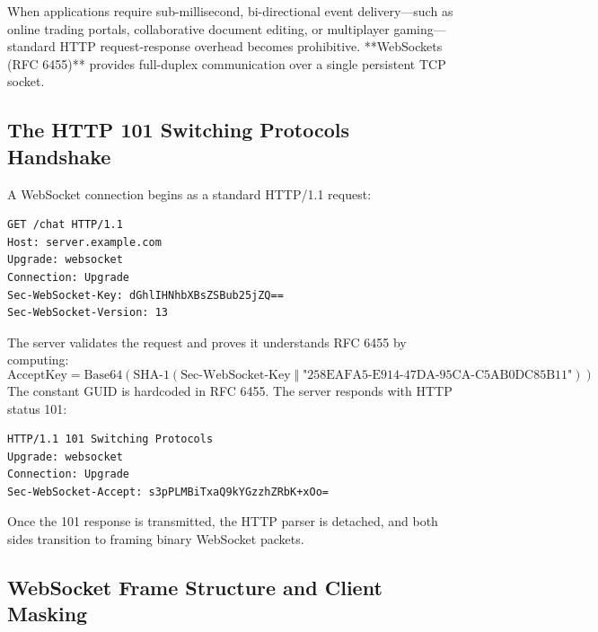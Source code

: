 When applications require sub-millisecond, bi-directional event delivery—such as online trading portals, collaborative document editing, or multiplayer gaming—standard HTTP request-response overhead becomes prohibitive. **WebSockets (RFC 6455)** provides full-duplex communication over a single persistent TCP socket.

\subsection{The HTTP 101 Switching Protocols Handshake}

A WebSocket connection begins as a standard HTTP/1.1 request:

\begin{lstlisting}[language=sh,caption={Client Handshake Request}]
GET /chat HTTP/1.1
Host: server.example.com
Upgrade: websocket
Connection: Upgrade
Sec-WebSocket-Key: dGhlIHNhbXBsZSBub25jZQ==
Sec-WebSocket-Version: 13
\end{lstlisting}

The server validates the request and proves it understands RFC 6455 by computing:
$$\text{AcceptKey} = \text{Base64}(\text{SHA-1}(\text{Sec-WebSocket-Key} \; \Vert \; \text{"258EAFA5-E914-47DA-95CA-C5AB0DC85B11"}))$$
The constant GUID is hardcoded in RFC 6455. The server responds with HTTP status 101:

\begin{lstlisting}[language=sh,caption={Server Handshake Response}]
HTTP/1.1 101 Switching Protocols
Upgrade: websocket
Connection: Upgrade
Sec-WebSocket-Accept: s3pPLMBiTxaQ9kYGzzhZRbK+xOo=
\end{lstlisting}
Once the 101 response is transmitted, the HTTP parser is detached, and both sides transition to framing binary WebSocket packets.

\subsection{WebSocket Frame Structure and Client Masking}


